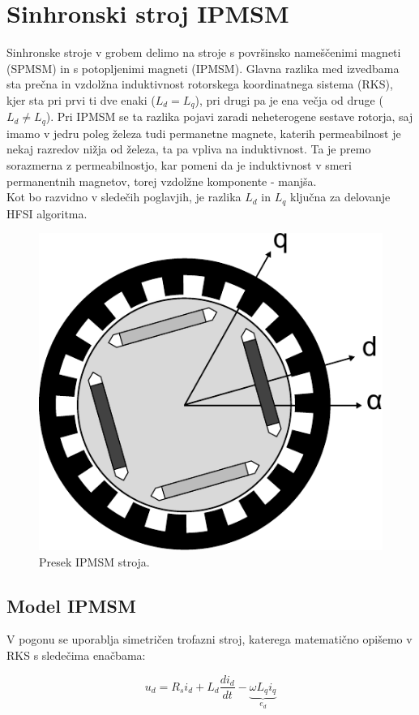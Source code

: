 \documentclass[a4paper,twoside,openright,12pt,slovene]{book}
\begin{document}
\chapter{Sinhronski stroj IPMSM} \label{sinhronskiStroj}

Sinhronske stroje v grobem delimo na stroje s površinsko nameščenimi magneti (SPMSM) in s potopljenimi magneti (IPMSM). Glavna razlika med izvedbama sta prečna in vzdolžna induktivnost rotorskega
koordinatnega sistema (RKS), kjer sta pri prvi ti dve enaki ($L_d = L_q$), pri drugi pa je ena večja od druge ($L_d \neq L_q$). Pri IPMSM se ta razlika pojavi zaradi neheterogene sestave rotorja, saj
imamo v jedru poleg železa tudi permanetne magnete, katerih permeabilnost je nekaj razredov nižja od železa, ta pa vpliva na induktivnost. Ta je premo sorazmerna z permeabilnostjo, kar pomeni da je
induktivnost v smeri permanentnih magnetov, torej vzdolžne komponente - manjša. \\
Kot bo razvidno v sledečih poglavjih, je razlika $L_d$ in $L_q$ ključna za delovanje HFSI algoritma. 

\begin{figure}[!htbp]
    \centering
    \includegraphics[width=0.5\columnwidth]{Slike/Inkscape/IPMSM.pdf}
    \caption{\label{IPMSM} Presek IPMSM stroja.}
\end{figure}


\section{Model IPMSM} \label{motor}

V pogonu se uporablja simetričen trofazni stroj, katerega matematično opišemo v RKS s sledečima enačbama:

\begin{equation} \label{motorModelD}
    u_d = R_si_d+L_d\frac{di_d}{dt}-\underbrace{\omega L_qi_q}_{e_d}
\end{equation}
\end{document}
